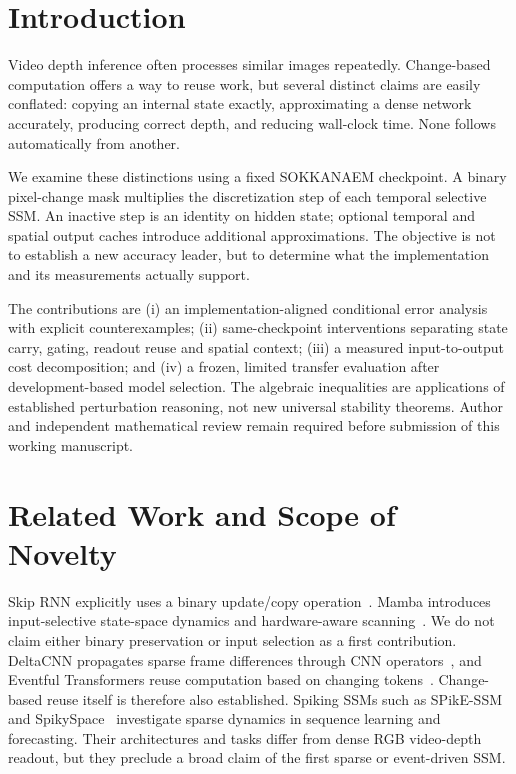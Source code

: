 \documentclass[mathematics,article,submit,moreauthors]{Definitions/mdpi}
\begin{document}
\section{Introduction}
Video depth inference often processes similar images repeatedly. Change-based computation
offers a way to reuse work, but several distinct claims are easily conflated: copying an
internal state exactly, approximating a dense network accurately, producing correct depth,
and reducing wall-clock time. None follows automatically from another.

We examine these distinctions using a fixed SOKKANAEM checkpoint. A binary pixel-change
mask multiplies the discretization step of each temporal selective SSM. An inactive step
is an identity on hidden state; optional temporal and spatial output caches introduce
additional approximations. The objective is not to establish a new accuracy leader, but
to determine what the implementation and its measurements actually support.

The contributions are (i) an implementation-aligned conditional error analysis with explicit
counterexamples; (ii) same-checkpoint interventions separating state carry, gating, readout
reuse and spatial context; (iii) a measured input-to-output cost decomposition; and (iv)
a frozen, limited transfer evaluation after development-based model selection.
The algebraic inequalities are applications of established perturbation reasoning, not
new universal stability theorems. Author and independent mathematical review remain
required before submission of this working manuscript.

\section{Related Work and Scope of Novelty}
Skip RNN explicitly uses a binary update/copy operation~\cite{campos2018}. Mamba introduces
input-selective state-space dynamics and hardware-aware scanning~\cite{gu2024}. We do not
claim either binary preservation or input selection as a first contribution.
DeltaCNN propagates sparse frame differences through CNN operators~\cite{deltacnn}, and
Eventful Transformers reuse computation based on changing tokens~\cite{eventful}.
Change-based reuse itself is therefore also established. Spiking SSMs such as
SPikE-SSM~\cite{spikessm} and SpikySpace~\cite{spikyspace} investigate sparse dynamics
in sequence learning and forecasting. Their architectures and tasks differ from dense
RGB video-depth readout, but they preclude a broad claim of the first sparse or event-driven SSM.
\end{document}
